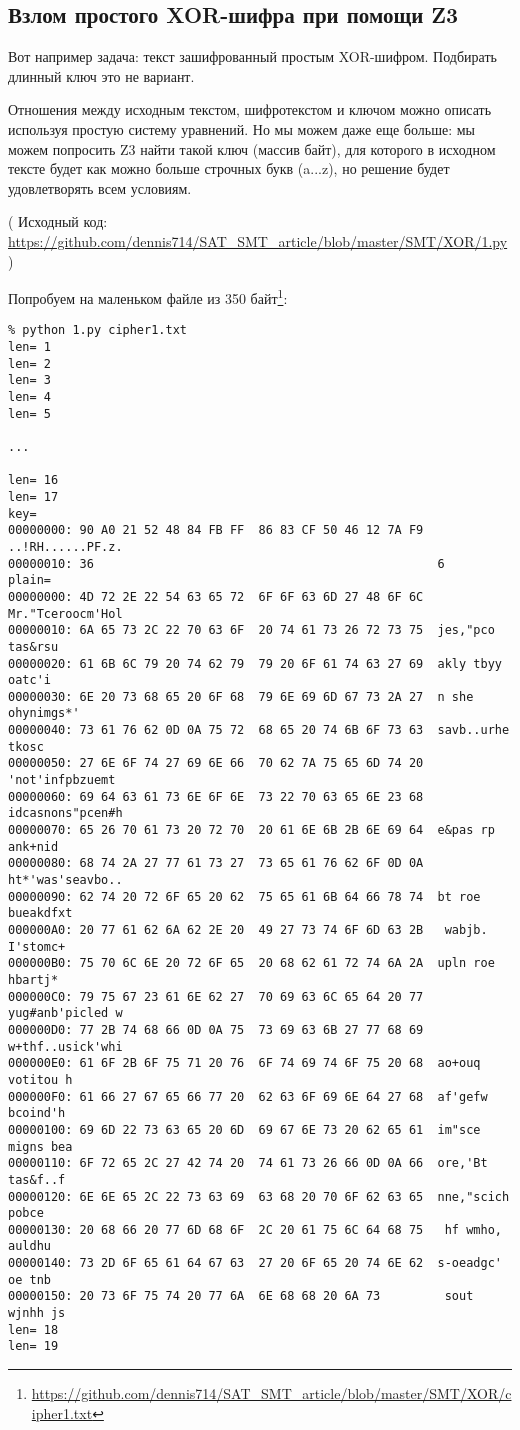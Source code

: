
\subsection{Взлом простого XOR-шифра при помощи Z3}

Вот например задача: текст зашифрованный простым XOR-шифром.
Подбирать длинный ключ это не вариант.

Отношения между исходным текстом, шифротекстом и ключом можно описать используя простую систему уравнений.
Но мы можем даже еще больше: мы можем попросить Z3 найти такой ключ (массив байт), для которого в исходном тексте
будет как можно больше строчных букв (a...z), но решение будет удовлетворять всем условиям.



( Исходный код: \url{https://github.com/dennis714/SAT_SMT_article/blob/master/SMT/XOR/1.py} )

Попробуем на маленьком файле из 350 байт\footnote{\url{https://github.com/dennis714/SAT_SMT_article/blob/master/SMT/XOR/cipher1.txt}}:

\begin{lstlisting}
% python 1.py cipher1.txt
len= 1
len= 2
len= 3
len= 4
len= 5

...

len= 16
len= 17
key=
00000000: 90 A0 21 52 48 84 FB FF  86 83 CF 50 46 12 7A F9  ..!RH......PF.z.
00000010: 36                                                6
plain=
00000000: 4D 72 2E 22 54 63 65 72  6F 6F 63 6D 27 48 6F 6C  Mr."Tceroocm'Hol
00000010: 6A 65 73 2C 22 70 63 6F  20 74 61 73 26 72 73 75  jes,"pco tas&rsu
00000020: 61 6B 6C 79 20 74 62 79  79 20 6F 61 74 63 27 69  akly tbyy oatc'i
00000030: 6E 20 73 68 65 20 6F 68  79 6E 69 6D 67 73 2A 27  n she ohynimgs*'
00000040: 73 61 76 62 0D 0A 75 72  68 65 20 74 6B 6F 73 63  savb..urhe tkosc
00000050: 27 6E 6F 74 27 69 6E 66  70 62 7A 75 65 6D 74 20  'not'infpbzuemt
00000060: 69 64 63 61 73 6E 6F 6E  73 22 70 63 65 6E 23 68  idcasnons"pcen#h
00000070: 65 26 70 61 73 20 72 70  20 61 6E 6B 2B 6E 69 64  e&pas rp ank+nid
00000080: 68 74 2A 27 77 61 73 27  73 65 61 76 62 6F 0D 0A  ht*'was'seavbo..
00000090: 62 74 20 72 6F 65 20 62  75 65 61 6B 64 66 78 74  bt roe bueakdfxt
000000A0: 20 77 61 62 6A 62 2E 20  49 27 73 74 6F 6D 63 2B   wabjb. I'stomc+
000000B0: 75 70 6C 6E 20 72 6F 65  20 68 62 61 72 74 6A 2A  upln roe hbartj*
000000C0: 79 75 67 23 61 6E 62 27  70 69 63 6C 65 64 20 77  yug#anb'picled w
000000D0: 77 2B 74 68 66 0D 0A 75  73 69 63 6B 27 77 68 69  w+thf..usick'whi
000000E0: 61 6F 2B 6F 75 71 20 76  6F 74 69 74 6F 75 20 68  ao+ouq votitou h
000000F0: 61 66 27 67 65 66 77 20  62 63 6F 69 6E 64 27 68  af'gefw bcoind'h
00000100: 69 6D 22 73 63 65 20 6D  69 67 6E 73 20 62 65 61  im"sce migns bea
00000110: 6F 72 65 2C 27 42 74 20  74 61 73 26 66 0D 0A 66  ore,'Bt tas&f..f
00000120: 6E 6E 65 2C 22 73 63 69  63 68 20 70 6F 62 63 65  nne,"scich pobce
00000130: 20 68 66 20 77 6D 68 6F  2C 20 61 75 6C 64 68 75   hf wmho, auldhu
00000140: 73 2D 6F 65 61 64 67 63  27 20 6F 65 20 74 6E 62  s-oeadgc' oe tnb
00000150: 20 73 6F 75 74 20 77 6A  6E 68 68 20 6A 73         sout wjnhh js
len= 18
len= 19
\end{lstlisting}

